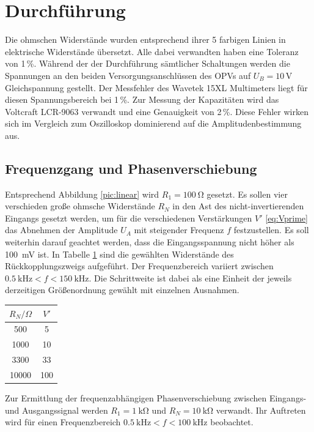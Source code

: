 \section{Durchführung}
Die ohmschen Widerstände wurden entsprechend ihrer 5 farbigen Linien in elektrische Widerstände übersetzt. Alle dabei verwandten haben eine
Toleranz von 1\,\%. 
Während der der Durchführung sämtlicher Schaltungen werden die Spannungen an den beiden Versorgungsanschlüssen des OPVs auf $U_B = 10$\,V Gleichspannung gestellt.
Der Messfehler des Wavetek 15XL Multimeters \cite{meterman} liegt für diesen Spannungsbereich bei 1\,\%. Zur Messung der Kapazitäten wird das 
Voltcraft LCR-9063 \cite{conrad} verwandt und eine Genauigkeit von 2\,\%. Diese Fehler wirken sich im Vergleich zum Oszilloskop dominierend auf
die Amplitudenbestimmung aus.

\subsection{Frequenzgang und Phasenverschiebung}
Entsprechend Abbildung \ref{pic:linear} wird $R_1 = \SI{100}{\ohm}$
gesetzt. Es sollen vier verschieden große ohmsche Widerstände $R_N$ in den Ast des nicht-invertierenden Eingangs gesetzt werden, um für
die verschiedenen Verstärkungen $V'$ \eqref{eq:Vprime} das 
Abnehmen der Amplitude $U_A$
mit steigender Frequenz $f$ festzustellen. Es soll weiterhin
darauf geachtet werden, dass die Eingangsspannung nicht höher als
\SI{100}{\milli\volt} ist. In Tabelle \ref{tab:verstaerkungen} sind
die gewählten Widerstände des Rückkopplungszweigs aufgeführt. Der
Frequenzbereich variiert zwischen $\SI{0.5}{\kilo\hertz} < f < \SI{150}{\kilo\hertz}$. Die Schrittweite ist dabei als eine Einheit der jeweils
derzeitigen Größenordnung gewählt mit einzelnen Ausnahmen.
\begin{table}[b]
 \begin{tabular}{c|c}
  $R_N/\Omega$ & $V'$\\
  \hline
  500 & 5\\
  1000 & 10 \\
  3300 & 33 \\
  10000 & 100
 \end{tabular}
\label{tab:verstaerkungen}
\end{table}
Zur Ermittlung der frequenzabhängigen Phasenverschiebung zwischen Eingangs- und Ausgangssignal
werden $R_1 = \SI{1}{\kilo\ohm}$ und $R_N = \SI{10}{\kilo\ohm}$ 
verwandt. Ihr Auftreten wird für einen Frequenzbereich 
$\SI{0.5}{\kilo\hertz} < f < \SI{100}{\kilo\hertz}$ beobachtet.

